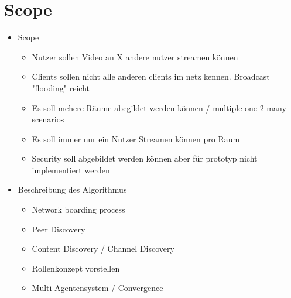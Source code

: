 \section{Scope}

\begin{itemize}
    \item Scope
    \begin{itemize}
        \item Nutzer sollen Video an X andere nutzer streamen können
        \item Clients sollen nicht alle anderen clients im netz kennen. Broadcast "flooding" reicht
        \item Es soll mehere Räume abegildet werden können / multiple one-2-many scenarios
        \item Es soll immer nur ein Nutzer Streamen können pro Raum
        \item Security soll abgebildet werden können aber für prototyp nicht implementiert werden
    \end{itemize}
    \item Beschreibung des Algorithmus
    \begin{itemize}
        \item Network boarding process
        \item Peer Discovery
        \item Content Discovery / Channel Discovery
        \item Rollenkonzept vorstellen
        \item Multi-Agentensystem / Convergence 
    \end{itemize}
\end{itemize}
